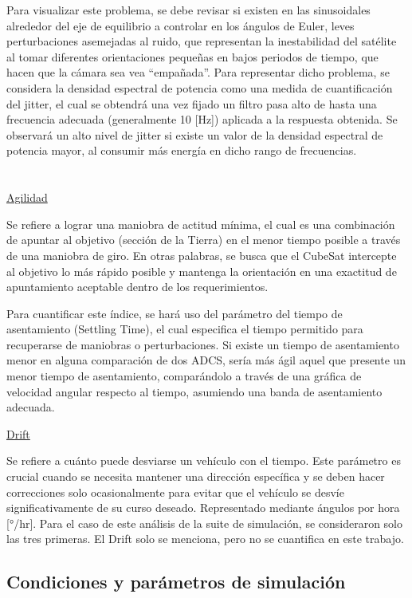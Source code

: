 Para visualizar este problema, se debe revisar si existen en las sinusoidales alrededor del eje de equilibrio a controlar en los ángulos de Euler, leves perturbaciones asemejadas al ruido, que representan la inestabilidad del satélite al tomar diferentes orientaciones pequeñas en bajos periodos de tiempo, que hacen que la cámara sea vea “empañada”. Para representar dicho problema, se considera la densidad espectral de potencia como una medida de cuantificación del jitter, el cual se obtendrá una vez fijado un filtro pasa alto de hasta una frecuencia adecuada (generalmente 10 [Hz]) aplicada a la respuesta obtenida. Se observará un alto nivel de jitter si existe un valor de la densidad espectral de potencia mayor, al consumir más energía en dicho rango de frecuencias.
\\
\\
\\
\underline{Agilidad \cite{ref5, ref11}}

Se refiere a lograr una maniobra de actitud mínima, el cual es una combinación de apuntar al objetivo (sección de la Tierra) en el menor tiempo posible a través de una maniobra de giro. En otras palabras, se busca que el CubeSat intercepte al objetivo lo más rápido posible y mantenga la orientación en una exactitud de apuntamiento aceptable dentro de los requerimientos.

Para cuantificar este índice, se hará uso del parámetro del tiempo de asentamiento (Settling Time), el cual especifica el tiempo permitido para recuperarse de maniobras o perturbaciones. Si existe un tiempo de asentamiento menor en alguna comparación de dos \gls{ADCS}, sería más ágil aquel que presente un menor tiempo de asentamiento, comparándolo a través de una gráfica de velocidad angular respecto al tiempo, asumiendo una banda de asentamiento adecuada.

\underline{Drift \cite{ref5}}

Se refiere a cuánto puede desviarse un vehículo con el tiempo. Este parámetro es crucial cuando se necesita mantener una dirección específica y se deben hacer correcciones solo ocasionalmente para evitar que el vehículo se desvíe significativamente de su curso deseado. Representado mediante ángulos por hora [°/hr]. Para el caso de este análisis de la suite de simulación, se consideraron solo las tres primeras. El Drift solo se menciona, pero no se cuantifica en este trabajo.

\subsection{Condiciones y parámetros de simulación}

